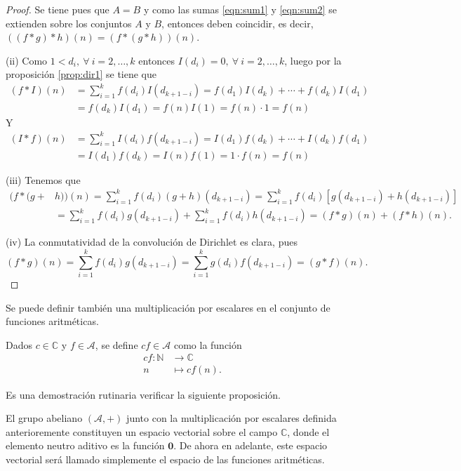 \begin{proof}
Se tiene pues que $A=B$ y como las sumas \eqref{eqn:sum1} y \eqref{eqn:sum2} se extienden sobre los conjuntos $A$ y $B$, entonces deben coincidir, es decir, $((f*g)*h)(n)=(f*(g*h))(n)$.
\bigskip

(ii) Como $1<d_i,\:\forall \: i=2,\ldots,k$ entonces $I(d_i)=0,\:\forall \: i=2,\ldots,k$, luego por la proposición \eqref{prop:dir1} se tiene que
\begin{align*}
	(f*I)(n) &= \sum_{i=1}^{k} f(d_i)I(d_{k+1-i})=f(d_1)I(d_k)+\cdots+f(d_k)I(d_1) \\
			 &= f(d_k)I(d_1)=f(n)I(1)=f(n)\cdot 1=f(n)
\end{align*}
Y
\begin{align*}
	(I*f)(n) &= \sum_{i=1}^{k} I(d_i)f(d_{k+1-i})=I(d_1)f(d_k)+\cdots+I(d_k)f(d_1) \\
			 &= I(d_1)f(d_k)=I(n)f(1)=1\cdot f(n)=f(n)
\end{align*}
\bigskip

(iii) Tenemos que 
\begin{align*}
	(f*(g+ & h)) (n) = \sum_{i=1}^{k} f(d_i)(g+h)(d_{k+1-i}) = \sum_{i=1}^{k} f(d_i)[g(d_{k+1-i})+h(d_{k+1-i})] \\
		   & = \sum_{i=1}^{k} f(d_i)g(d_{k+1-i})+\sum_{i=1}^{k} f(d_i)h(d_{k+1-i}) = (f*g)(n)+(f*h)(n).
\end{align*}
\bigskip

(iv) La conmutatividad de la convolución de Dirichlet es clara, pues 
\begin{equation*}
	(f*g)(n) = \sum_{i=1}^{k} f(d_i)g(d_{k+1-i}) = \sum_{i=1}^{k} g(d_i)f(d_{k+1-i})=(g*f)(n).
\end{equation*}
\end{proof}

Se puede definir también una multiplicación por escalares en el conjunto de funciones aritméticas.

\begin{definition}
Dados $c \in \mathbb{C}$ y $f \in \mathcal{A}$, se define $c f \in \mathcal{A}$ como la función
\begin{align*}
    c f : \mathbb{N} & \longrightarrow \mathbb{C} \\
    n & \longmapsto c f(n).
\end{align*}
\end{definition}

Es una demostración rutinaria verificar la siguiente proposición.

\begin{proposition}
El grupo abeliano $(\mathcal{A}, +)$ junto con la multiplicación por escalares definida anterioremente constituyen un espacio vectorial sobre el campo $\mathbb{C}$, donde el elemento neutro aditivo es la función $\mathbf{0}$. De ahora en adelante, este espacio vectorial será llamado simplemente el espacio de las funciones aritméticas.
\end{proposition}

